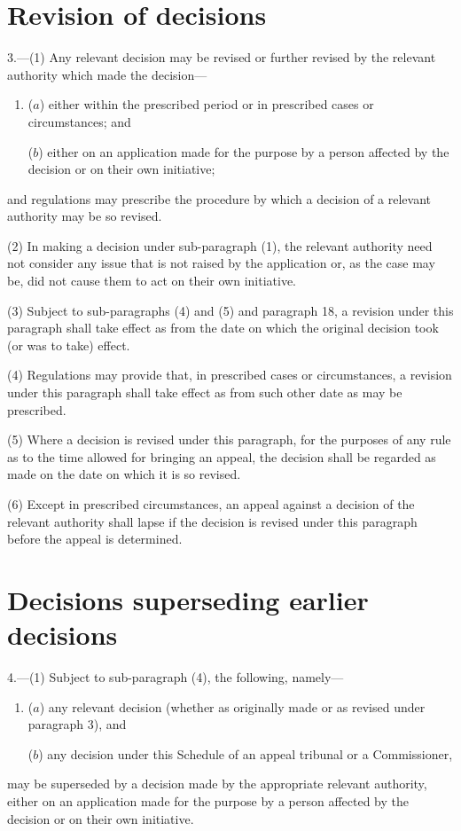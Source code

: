 \documentclass[12pt,a4paper]{article}
\begin{document}
\section*{Revision of decisions}

3.---(1) Any relevant decision may be revised or further revised by the relevant authority which made the decision—
\begin{enumerate}\item[]
($a$) either within the prescribed period or in prescribed cases or circumstances; and

($b$) either on an application made for the purpose by a person affected by the decision or on their own initiative;
\end{enumerate}
and regulations may prescribe the procedure by which a decision of a relevant authority may be so revised.

(2) In making a decision under sub-paragraph (1), the relevant authority need not consider any issue that is not raised by the application or, as the case may be, did not cause them to act on their own initiative.

(3) Subject to sub-paragraphs (4)  and (5)  and paragraph 18, a revision under this paragraph shall take effect as from the date on which the original decision took (or was to take) effect.

(4) Regulations may provide that, in prescribed cases or circumstances, a revision under this paragraph shall take effect as from such other date as may be prescribed.

(5) Where a decision is revised under this paragraph, for the purposes of any rule as to the time allowed for bringing an appeal, the decision shall be regarded as made on the date on which it is so revised.

(6) Except in prescribed circumstances, an appeal against a decision of the relevant authority shall lapse if the decision is revised under this paragraph before the appeal is determined.

\section*{Decisions superseding earlier decisions}

4.---(1) Subject to sub-paragraph (4), the following, namely—
\begin{enumerate}\item[]
($a$) any relevant decision (whether as originally made or as revised under paragraph 3), and

($b$) any decision under this Schedule of an appeal tribunal or a Commissioner,
\end{enumerate}
may be superseded by a decision made by the appropriate relevant authority, either on an application made for the purpose by a person affected by the decision or on their own initiative.
\end{document}
